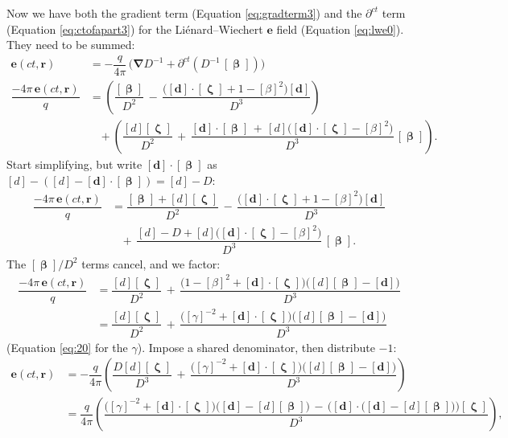 \documentclass[12pt]{article}
\renewcommand{\vv}[1]{\mathbf{#1}}
\newcommand{\vvbeta}{\bm{\upbeta}}
\newcommand{\vvzeta}{\bm{\upzeta}}
\newcommand{\del}{\boldsymbol{\nabla}}
\begin{document}
Now we have both the gradient term (Equation \ref{eq:gradterm3}) and the $\partial^{ct}$ term (Equation \ref{eq:ctofapart3}) for the Li\'enard--Wiechert $\vv e$ field (Equation \ref{eq:lwe0}). They need to be summed:
\begin{equation*}
\begin{split}
\vv e (ct, \vv r) &= - \dfrac{q}{4 \pi} \, \Big( \del D^{-1} + \partial^{ct} \left( D^{-1} \, [\vvbeta] \right) \Big) \\[6pt]
\dfrac{- 4 \pi \, \vv e (ct, \vv r)}{q} &= \left( \dfrac{[\vvbeta] }{D^{2}} \, - \, \dfrac{\big( [\vv d] \cdot [\vvzeta] + 1 - [\beta]^2 \big) [\vv d] }{D^{3}} \right) \\[3pt]
& \; \; \; + \left( \dfrac{[d] [\vvzeta]}{D^2} \, + \, \dfrac{[\vv d] \cdot [\vvbeta] \, + \, [d] \big( [\vv d] \cdot [\vvzeta] - [\beta]^2 \big)}{D^3} \, [\vvbeta] \right) .
\end{split}
\end{equation*}
Start simplifying, but write $[\vv d ] \cdot [\vvbeta]$ as $[d] - ([d] - [\vv d] \cdot [\vvbeta]) = [d] - D$:
\begin{equation*}
\begin{split}
\dfrac{ - 4 \pi \, \vv e (ct, \vv r)}{q} &= \dfrac{[\vvbeta] + [d] [\vvzeta]}{D^{2}} \, - \, \dfrac{\big( [\vv d] \cdot [\vvzeta] + 1 - [\beta]^2 \big) [\vv d] }{D^{3}} \\[8pt]
& \; \; \; + \, \dfrac{[d] - D + [d] \big( [\vv d] \cdot [\vvzeta] - [\beta]^2 \big)}{D^3} \, [\vvbeta] .
\end{split}
\end{equation*}
The $[\vvbeta]/D^2$ terms cancel, and we factor:
\begin{equation*}
\begin{split}
\dfrac{- 4 \pi \, \vv e (ct, \vv r)}{q} &= \dfrac{[d] [\vvzeta]}{D^{2}} \, + \, \dfrac{\big(1 - [\beta]^2 + [\vv d] \cdot [\vvzeta] \big)\big([d] [\vvbeta] - [\vv d] \big)}{D^3} \\[7pt]
&= \dfrac{[d] [\vvzeta]}{D^{2}} \, + \, \dfrac{\big([\gamma]^{-2} + [\vv d] \cdot [\vvzeta] \big)\big([d] [\vvbeta] - [\vv d] \big)}{D^3}
\end{split}
\end{equation*}
(Equation \ref{eq:20} for the $\gamma$). Impose a shared denominator, then distribute $-1$:
\begin{equation*}
\begin{split}
\vv e (ct, \vv r) &= - \dfrac{q}{4 \pi} \left( \dfrac{D [d] [\vvzeta]}{D^{3}} \, + \, \dfrac{\big([\gamma]^{-2} + [\vv d] \cdot [\vvzeta] \big)\big([d] [\vvbeta] - [\vv d] \big)}{D^3} \right) \\[4pt]
&= \dfrac{q}{4 \pi} \left(\dfrac{\big([\gamma]^{-2} + [\vv d] \cdot [\vvzeta] \big)\big( [\vv d] - [d] [\vvbeta] \big) \, - \, \Big( [\vv d] \cdot \big( [\vv d] - [d][\vvbeta] \big) \Big)[\vvzeta]}{D^3} \right),
\end{split}
\end{equation*}
\end{document}
